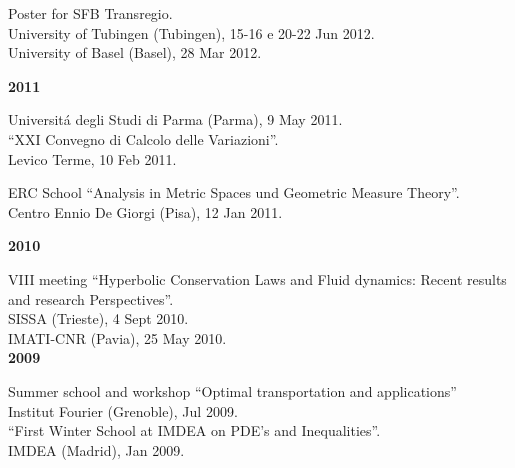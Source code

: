 \documentclass[10pt]{article}
\newcommand{\blankline}{\quad\pagebreak[2]}
\begin{document}
Poster for SFB Transregio.\\
University of Tubingen (Tubingen), 15-16 e 20-22 Jun 2012.\\

University of Basel (Basel), 28 Mar 2012.\\
\blankline



\textbf{2011}\\
\blankline

Universit\'a degli Studi di Parma (Parma), 9 May 2011.\\

``XXI Convegno di Calcolo delle Variazioni''.\\
Levico Terme, 10 Feb 2011.\\
\blankline

ERC School ``Analysis in Metric Spaces und Geometric Measure Theory''.\\
Centro Ennio De Giorgi (Pisa), 12 Jan 2011.\\
\blankline

\textbf{2010}\\
\blankline 

VIII meeting ``Hyperbolic Conservation Laws and Fluid dynamics: Recent results and
research Perspectives''.\\
SISSA (Trieste), 4 Sept 2010.\\

IMATI-CNR (Pavia), 25 May 2010.\\


\textbf{2009}\\
\blankline 

Summer school and workshop ``Optimal transportation and applications''\\
Institut Fourier (Grenoble), Jul 2009.\\

``First Winter School at IMDEA on PDE's and Inequalities''.\\
IMDEA (Madrid), Jan 2009.\\
\blankline
\end{document}
